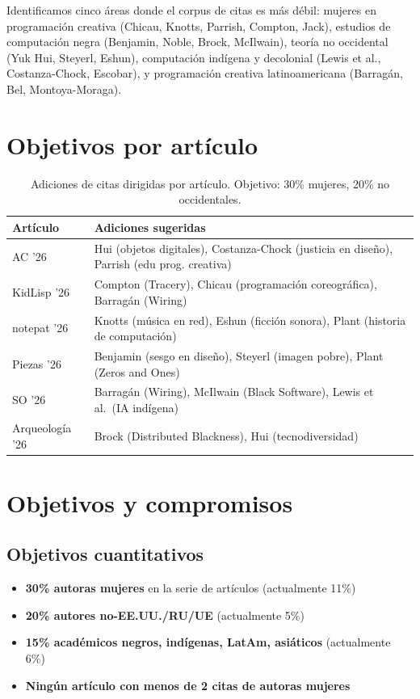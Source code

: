 \documentclass[10pt,letterpaper,twocolumn]{article}
\begin{document}
Identificamos cinco áreas donde el corpus de citas es más débil: mujeres en programación creativa (Chicau, Knotts, Parrish, Compton, Jack), estudios de computación negra (Benjamin, Noble, Brock, McIlwain), teoría no occidental (Yuk Hui, Steyerl, Eshun), computación indígena y decolonial (Lewis et al., Costanza-Chock, Escobar), y programación creativa latinoamericana (Barragán, Bel, Montoya-Moraga).

\section{Objetivos por artículo}

\begin{table}[h]
\small
\centering
\begin{tabularx}{\columnwidth}{lX}
\toprule
\textbf{Artículo} & \textbf{Adiciones sugeridas} \\
\midrule
AC '26 & Hui (objetos digitales), Costanza-Chock (justicia en diseño), Parrish (edu prog. creativa) \\
\addlinespace
KidLisp '26 & Compton (Tracery), Chicau (programación coreográfica), Barragán (Wiring) \\
\addlinespace
notepat '26 & Knotts (música en red), Eshun (ficción sonora), Plant (historia de computación) \\
\addlinespace
Piezas '26 & Benjamin (sesgo en diseño), Steyerl (imagen pobre), Plant (Zeros and Ones) \\
\addlinespace
SO '26 & Barragán (Wiring), McIlwain (Black Software), Lewis et al.\ (IA indígena) \\
\addlinespace
Arqueología '26 & Brock (Distributed Blackness), Hui (tecnodiversidad) \\
\bottomrule
\end{tabularx}
\caption{Adiciones de citas dirigidas por artículo. Objetivo: 30\% mujeres, 20\% no occidentales.}
\label{tab:targets}
\end{table}

\section{Objetivos y compromisos}

\subsection{Objetivos cuantitativos}

\begin{itemize}
  \item \textbf{30\% autoras mujeres} en la serie de artículos (actualmente 11\%)
  \item \textbf{20\% autores no-EE.UU./RU/UE} (actualmente 5\%)
  \item \textbf{15\% académicos negros, indígenas, LatAm, asiáticos} (actualmente 6\%)
  \item \textbf{Ningún artículo con menos de 2 citas de autoras mujeres}
\end{itemize}
\end{document}
